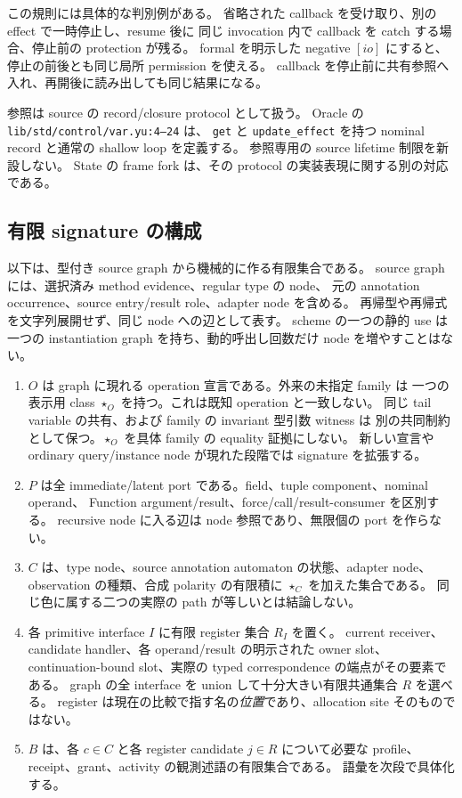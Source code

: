 \documentclass[11pt,a4paper]{article}
\theoremstyle{remark}
\begin{document}
この規則には具体的な判別例がある。
省略された callback を受け取り、別の effect で一時停止し、resume 後に
同じ invocation 内で callback を catch する場合、停止前の protection が残る。
formal を明示した negative $[io]$ にすると、停止の前後とも同じ局所 permission を使える。
callback を停止前に共有参照へ入れ、再開後に読み出しても同じ結果になる。

参照は source の record/closure protocol として扱う。
Oracle の \texttt{lib/std/control/var.yu:4--24} は、
\texttt{get} と \texttt{update\_effect} を持つ nominal record と通常の shallow loop を定義する。
参照専用の source lifetime 制限を新設しない。
State の frame fork は、その protocol の実装表現に関する別の対応である。

\subsection{有限 signature の構成}

以下は、型付き source graph から機械的に作る有限集合である。
source graph には、選択済み method evidence、regular type の node、
元の annotation occurrence、source entry/result role、adapter node を含める。
再帰型や再帰式を文字列展開せず、同じ node への辺として表す。
scheme の一つの静的 use は一つの instantiation graph を持ち、動的呼出し回数だけ
node を増やすことはない。

\begin{enumerate}
\item $O$ は graph に現れる operation 宣言である。外来の未指定 family は
  一つの表示用 class $\star_O$ を持つ。これは既知 operation と一致しない。
  同じ tail variable の共有、および family の invariant 型引数 witness は
  別の共同制約として保つ。$\star_O$ を具体 family の equality 証拠にしない。
  新しい宣言や ordinary query/instance node が現れた段階では signature を拡張する。
\item $P$ は全 immediate/latent port である。field、tuple component、nominal operand、
  Function argument/result、force/call/result-consumer を区別する。
  recursive node に入る辺は node 参照であり、無限個の port を作らない。
\item $C$ は、type node、source annotation automaton の状態、adapter node、
  observation の種類、合成 polarity の有限積に $\star_C$ を加えた集合である。
  同じ色に属する二つの実際の path が等しいとは結論しない。
\item 各 primitive interface $I$ に有限 register 集合 $R_I$ を置く。
  current receiver、candidate handler、各 operand/result の明示された owner slot、
  continuation-bound slot、実際の typed correspondence の端点がその要素である。
  graph の全 interface を union して十分大きい有限共通集合 $R$ を選べる。
  register は現在の比較で指す名の\emph{位置}であり、allocation site そのものではない。
\item $B$ は、各 $c\in C$ と各 register candidate $j\in R$ について必要な
  profile、receipt、grant、activity の観測述語の有限集合である。
  語彙を次段で具体化する。
\end{enumerate}
\end{document}
